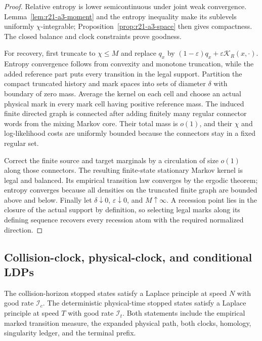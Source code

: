\begin{proof}
Relative entropy is lower semicontinuous under joint weak convergence.
Lemma~\ref{lem:r21-a3-moment} and the entropy inequality make its sublevels
uniformly $\chi$-integrable; Proposition~\ref{prop:r21-a3-space} then gives
compactness.  The closed balance and clock constraints prove goodness.

For recovery, first truncate to $\chi\le M$ and replace $q_x$ by
$(1-\varepsilon)q_x+\varepsilon\mathcal K_R(x,\cdot)$.  Entropy convergence
follows from convexity and monotone truncation, while the added reference part
puts every transition in the legal support.  Partition the compact truncated
history and mark spaces into sets of diameter $\delta$ with boundary of zero
mass.  Average the kernel on each cell and choose an actual physical mark in
every mark cell having positive reference mass.  The induced finite directed
graph is connected after adding finitely many regular connector words from
the mixing Markov core.  Their total mass is $o(1)$, and their $\chi$ and
log-likelihood costs are uniformly bounded because the connectors stay in a
fixed regular set.

Correct the finite source and target marginals by a circulation of size
$o(1)$ along those connectors.  The resulting finite-state stationary Markov
kernel is legal and balanced.  Its empirical transition law converges by the
ergodic theorem; entropy converges because all densities on the truncated
finite graph are bounded above and below.  Finally let
$\delta\downarrow0$, $\varepsilon\downarrow0$, and $M\uparrow\infty$.
A recession point lies in the closure of the actual support by definition, so
selecting legal marks along its defining sequence recovers every recession
atom with the required normalized direction.
\end{proof}

\subsection{Collision-clock, physical-clock, and conditional LDPs}

\begin{theorem}
\label{thm:r21-a3-ldp}
The collision-horizon stopped states satisfy a Laplace principle at speed $N$
with good rate $\mathcal I_c$.  The deterministic physical-time stopped states
satisfy a Laplace principle at speed $T$ with good rate $\mathcal I_t$.  Both
statements include the empirical marked transition measure, the expanded
physical path, both clocks, homology, singularity ledger, and the terminal
prefix.
\end{theorem}

